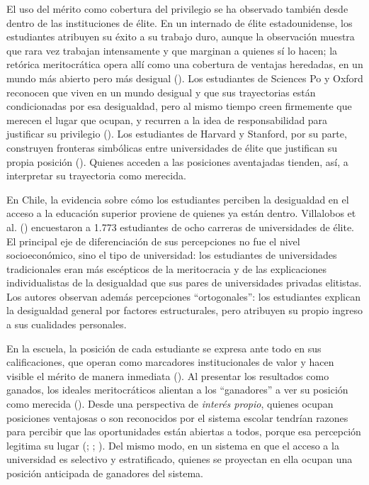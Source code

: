 \documentclass[
  spanish,
  a4paper,
  oneside]{scrbook}
\begin{document}
El uso del mérito como cobertura del privilegio se ha observado también
desde dentro de las instituciones de élite. En un internado de élite
estadounidense, los estudiantes atribuyen su éxito a su trabajo duro,
aunque la observación muestra que rara vez trabajan intensamente y que
marginan a quienes sí lo hacen; la retórica meritocrática opera allí
como una cobertura de ventajas heredadas, en un mundo más abierto pero
más desigual ().
Los estudiantes de Sciences Po y Oxford reconocen que viven en un mundo
desigual y que sus trayectorias están condicionadas por esa desigualdad,
pero al mismo tiempo creen firmemente que merecen el lugar que ocupan, y
recurren a la idea de responsabilidad para justificar su privilegio
(). Los
estudiantes de Harvard y Stanford, por su parte, construyen fronteras
simbólicas entre universidades de élite que justifican su propia
posición (). Quienes acceden a las posiciones aventajadas tienden, así, a
interpretar su trayectoria como merecida.

En Chile, la evidencia sobre cómo los estudiantes perciben la
desigualdad en el acceso a la educación superior proviene de quienes ya
están dentro. Villalobos et al.
() encuestaron a 1.773
estudiantes de ocho carreras de universidades de élite. El principal eje
de diferenciación de sus percepciones no fue el nivel socioeconómico,
sino el tipo de universidad: los estudiantes de universidades
tradicionales eran más escépticos de la meritocracia y de las
explicaciones individualistas de la desigualdad que sus pares de
universidades privadas elitistas. Los autores observan además
percepciones ``ortogonales'': los estudiantes explican la desigualdad
general por factores estructurales, pero atribuyen su propio ingreso a
sus cualidades personales.

En la escuela, la posición de cada estudiante se expresa ante todo en
sus calificaciones, que operan como marcadores institucionales de valor
y hacen visible el mérito de manera inmediata
(). Al presentar los
resultados como ganados, los ideales meritocráticos alientan a los
``ganadores'' a ver su posición como merecida
(). Desde una
perspectiva de \emph{interés propio}, quienes ocupan posiciones
ventajosas o son reconocidos por el sistema escolar tendrían razones
para percibir que las oportunidades están abiertas a todos, porque esa
percepción legitima su lugar (; ; ). Del mismo modo, en un sistema en que el acceso a la universidad
es selectivo y estratificado, quienes se proyectan en ella ocupan una
posición anticipada de ganadores del sistema.
\end{document}
